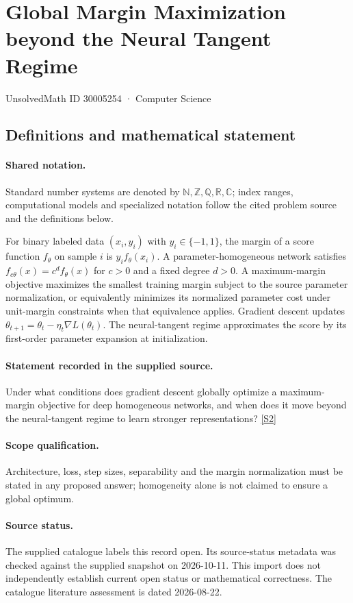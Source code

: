 \documentclass[11pt]{article}
\newcommand{\sref}[2]{\hyperlink{source:#1:#2}{[S#2]}}
\begin{document}
\setcounter{section}{30005253}
\section{Global Margin Maximization beyond the Neural Tangent Regime}\label{30005254}
{\small\sffamily UnsolvedMath ID 30005254 · Computer Science}
\subsection{Definitions and mathematical statement}

\paragraph{Shared notation.}Standard number systems are denoted by $\mathbb N,\mathbb Z,\mathbb Q,\mathbb R,\mathbb C$; index ranges, computational models and specialized notation follow the cited problem source and the definitions below.


For binary labeled data $(x_i,y_i)$ with $y_i\in\{-1,1\}$, the margin of a score function $f_\theta$ on sample $i$ is $y_i f_\theta(x_i)$. A parameter-homogeneous network satisfies $f_{c\theta}(x)=c^d f_\theta(x)$ for $c>0$ and a fixed degree $d>0$. A maximum-margin objective maximizes the smallest training margin subject to the source parameter normalization, or equivalently minimizes its normalized parameter cost under unit-margin constraints when that equivalence applies. Gradient descent updates $\theta_{t+1}=\theta_t-\eta_t\nabla L(\theta_t)$. The neural-tangent regime approximates the score by its first-order parameter expansion at initialization.
\paragraph{Statement recorded in the supplied source.}
Under what conditions does gradient descent globally optimize a maximum-margin objective for deep homogeneous networks, and when does it move beyond the neural-tangent regime to learn stronger representations? \sref{30005254}{2}
\paragraph{Scope qualification.}
Architecture, loss, step sizes, separability and the margin normalization must be stated in any proposed answer; homogeneity alone is not claimed to ensure a global optimum.
\paragraph{Source status.}
The supplied catalogue labels this record open. Its source-status metadata was checked against the supplied snapshot on 2026-10-11. This import does not independently establish current open status or mathematical correctness. The catalogue literature assessment is dated 2026-08-22.
\end{document}
